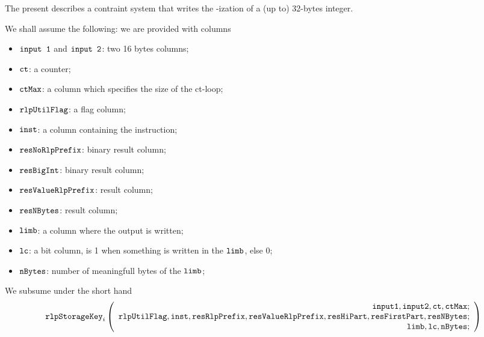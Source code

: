 The present describes a contraint system that writes the \rlp{}-ization of a (up to) 32-bytes integer.

We shall assume the following: we are provided with columns
\begin{itemize}
    \item $\texttt{input 1}$ and $\texttt{input 2}$: two 16 bytes columns;
    \item $\texttt{ct}$: a counter;
    \item $\texttt{ctMax}$: a column which specifies the size of the ct-loop;
    \item $\texttt{rlpUtilFlag}$: a flag column;
    \item $\texttt{inst}$: a column containing the instruction;
    \item $\texttt{resNoRlpPrefix}$: binary result column;
    \item $\texttt{resBigInt}$: binary result column;
    \item $\texttt{resValueRlpPrefix}$: result column;
    \item $\texttt{resNBytes}$: result column;
    \item $\texttt{limb}$: a column where the output is written;
    \item $\texttt{lc}$: a bit column, is 1 when something is written in the $\texttt{limb}$, else 0;
    \item $\texttt{nBytes}$: number of meaningfull bytes of the $\texttt{limb}$;
\end{itemize}

\noindent We subsume under the short hand
\[
    \texttt{rlpStorageKey}_{i}
    \left(
	\begin{array}{r}
    \texttt{input1},
    \texttt{input2},
    \texttt{ct},
    \texttt{ctMax}; \\
    \texttt{rlpUtilFlag},
    \texttt{inst},
    \texttt{resRlpPrefix},
    \texttt{resValueRlpPrefix},
    \texttt{resHiPart},
    \texttt{resFirstPart},
    \texttt{resNBytes}; \\
    \texttt{limb},
    \texttt{lc},
    \texttt{nBytes}; \\
    \end{array}
	\right)
\]

